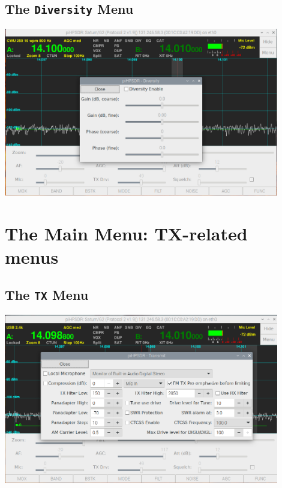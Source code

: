\documentclass[12pt]{book}
\begin{document}
\section{The \texttt{Diversity} Menu}
\begin{center}
\includegraphics[width=12cm]{DiversityMenu.png}
\end{center}

\chapter{The Main Menu: TX-related menus}

\section{The \texttt{TX} Menu}
\begin{center}
\includegraphics[width=12cm]{TXMenu.png}
\end{center}
\end{document}
